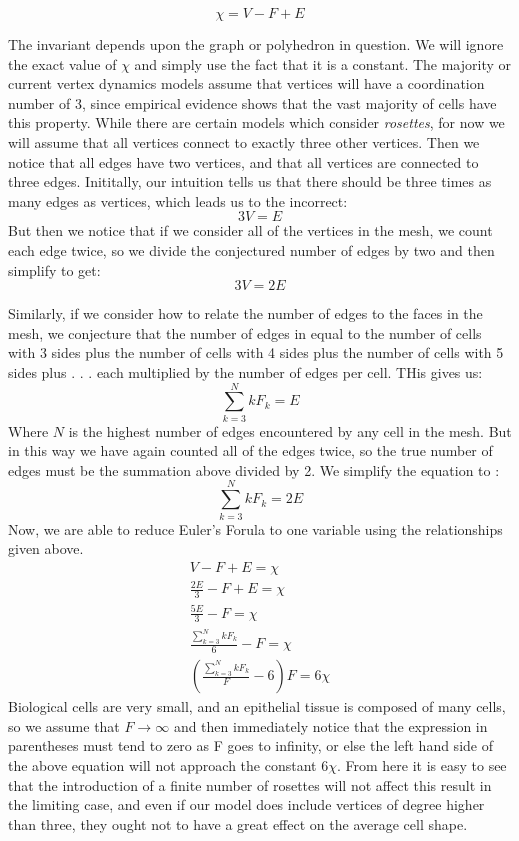 \begin{equation}
\chi = V - F + E
\end{equation}

The invariant depends upon the graph or polyhedron in question. We will ignore the exact value of $\chi$ and simply use the fact that it is a constant. The majority or current vertex dynamics models assume that vertices will have a coordination number of 3, since empirical evidence shows that the vast majority of cells have this property\cite{Overview}. While there are certain models which consider \emph{rosettes}, for now we will assume that all vertices connect to exactly three other vertices. Then we notice that all edges have two vertices, and that all vertices are connected to three edges. Inititally, our intuition tells us that there should be three times as many edges as vertices, which leads us to the incorrect:
\begin{equation}
3V = E
\end{equation}
But then we notice that if we consider all of the vertices in the mesh, we count each edge twice, so we divide the conjectured  number of edges by two and then simplify to get:
\begin{equation}
3V = 2E
\end{equation}

Similarly, if we consider how to relate the number of edges to the faces in the mesh, we conjecture that the number of edges in equal to the number of cells with 3 sides plus the number of cells with 4 sides plus the number of cells with 5 sides plus . . . each multiplied by the number of edges per cell. THis gives us:
\begin{equation}
\sum_{k=3}^N kF_k = E
\end{equation}
Where $N$ is the highest number of edges encountered by any cell in the mesh. But in this way we have again counted all of the edges twice, so the true number of edges must be the summation above divided by 2. We simplify the equation to :
\begin{equation}
\sum_{k=3}^N kF_k = 2E
\end{equation}
Now, we are able to reduce Euler's Forula to one variable using the relationships given above.
\begin{gather}
V - F + E = \chi\\
\frac{2E}3 - F + E = \chi\\
\frac{5E}3 - F = \chi\\
\frac{\sum_{k=3}^N kF_k}{6} - F = \chi\\
(\frac{\sum_{k=3}^N kF_k}{F} - 6)F = 6\chi
\end{gather}
Biological cells are very small, and an epithelial tissue is composed of many cells, so we assume that $F\to\infty$ and then immediately notice that the expression in parentheses must tend to zero as F goes to infinity, or else the left hand side of the above equation will not approach the constant $6\chi$. From here it is easy to see that the introduction of a finite number of rosettes will not affect this result in the limiting case, and even if our model does include vertices of degree higher than three, they ought not to have a great effect on the average cell shape.

